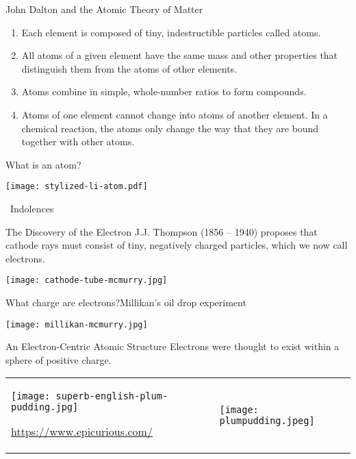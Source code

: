 \documentclass[notes=show]{beamer}
\begin{document}
\begin{frame}{John Dalton and the Atomic Theory of Matter}
	\begin{enumerate}[<+->]
		\item Each element is composed of tiny, indestructible particles
			called atoms.
		\item All atoms of a given element have the same mass and other
			properties that distinguish them from the atoms of other
			elements.
		\item Atoms combine in simple, whole-number ratios to form
			compounds.
		\item Atoms of one element cannot change into atoms of another
			element. In a chemical reaction, the atoms only change
			the way that they are \alert{bound together} with other
			atoms.
	\end{enumerate}
\end{frame}

\begin{frame}{What is an atom?}
	\centering

	\texttt{[image: stylized-li-atom.pdf]}

	\bigskip

	\tiny\ccbysa\ Indolences
\end{frame}

\begin{frame}{The Discovery of the Electron}
	J.J. Thompson (1856 -- 1940) proposes that cathode rays must consist of
	tiny, negatively charged particles, which we now call \alert{electrons}.

	\begin{center}
		\texttt{[image: cathode-tube-mcmurry.jpg]}
	\end{center}
\end{frame}

\begin{frame}{What charge are electrons?}{Millikan's oil drop experiment}
	\begin{center}
		\texttt{[image: millikan-mcmurry.jpg]}
	\end{center}
\end{frame}

\begin{frame}{An Electron-Centric Atomic Structure}
	Electrons were thought to exist within a sphere of
	positive charge.

	\begin{tabularx}{\linewidth} {X@{\qquad}X}
		\texttt{[image: superb-english-plum-pudding.jpg]}

		\tiny\url{https://www.epicurious.com/}
		& \texttt{[image: plumpudding.jpeg]} \\
	\end{tabularx}
\end{frame}
\end{document}
